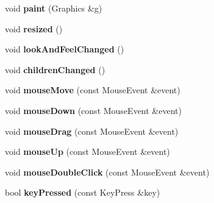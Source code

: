 \begin{DoxyCompactItemize}
\item 
\hypertarget{class_j_u_c_e___designer_a0430dec4e33b74125d621b20ea1b0362}{void {\bfseries paint} (Graphics \&g)}\label{class_j_u_c_e___designer_a0430dec4e33b74125d621b20ea1b0362}

\item 
\hypertarget{class_j_u_c_e___designer_a0e5e3642a98c3f7be37290f19631553d}{void {\bfseries resized} ()}\label{class_j_u_c_e___designer_a0e5e3642a98c3f7be37290f19631553d}

\item 
\hypertarget{class_j_u_c_e___designer_a08f47600c19d4a7ebbd2f4e9a48ecf7f}{void {\bfseries look\-And\-Feel\-Changed} ()}\label{class_j_u_c_e___designer_a08f47600c19d4a7ebbd2f4e9a48ecf7f}

\item 
\hypertarget{class_j_u_c_e___designer_aea4edd064ca6d1c7d0f8bd2ccdefceba}{void {\bfseries children\-Changed} ()}\label{class_j_u_c_e___designer_aea4edd064ca6d1c7d0f8bd2ccdefceba}

\item 
\hypertarget{class_j_u_c_e___designer_a2db0368a5686ee3564837af80d4cc16c}{void {\bfseries mouse\-Move} (const Mouse\-Event \&event)}\label{class_j_u_c_e___designer_a2db0368a5686ee3564837af80d4cc16c}

\item 
\hypertarget{class_j_u_c_e___designer_aeaab6202fcb221c1e6a699b0d91287dc}{void {\bfseries mouse\-Down} (const Mouse\-Event \&event)}\label{class_j_u_c_e___designer_aeaab6202fcb221c1e6a699b0d91287dc}

\item 
\hypertarget{class_j_u_c_e___designer_aae634fb2dcc56702fa58b5910a1b47c9}{void {\bfseries mouse\-Drag} (const Mouse\-Event \&event)}\label{class_j_u_c_e___designer_aae634fb2dcc56702fa58b5910a1b47c9}

\item 
\hypertarget{class_j_u_c_e___designer_a4942b59bad58632a6dd5d79262a36c1f}{void {\bfseries mouse\-Up} (const Mouse\-Event \&event)}\label{class_j_u_c_e___designer_a4942b59bad58632a6dd5d79262a36c1f}

\item 
\hypertarget{class_j_u_c_e___designer_a694b9bd6af62913a795a9d98905849e0}{void {\bfseries mouse\-Double\-Click} (const Mouse\-Event \&event)}\label{class_j_u_c_e___designer_a694b9bd6af62913a795a9d98905849e0}

\item 
\hypertarget{class_j_u_c_e___designer_aebb50a2cf6a3ca2c6e0fa5bc05b28aef}{bool {\bfseries key\-Pressed} (const Key\-Press \&key)}\label{class_j_u_c_e___designer_aebb50a2cf6a3ca2c6e0fa5bc05b28aef}


\end{DoxyCompactItemize}

